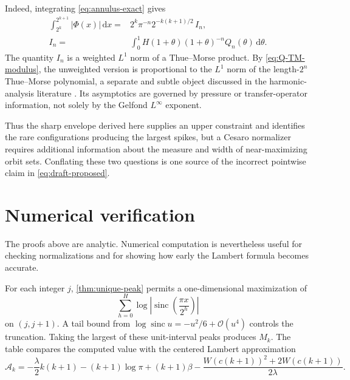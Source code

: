 \documentclass[11pt,oneside]{article}
\theoremstyle{definition}
\theoremstyle{remark}
\newcommand{\sinc}{\operatorname{sinc}}
\newcommand{\dd}{\,\mathrm d}
\newcommand{\bigO}{\mathcal O}
\newcommand{\PhiF}{\Phi}
\begin{document}
Indeed, integrating \eqref{eq:annulus-exact} gives
\begin{equation}
\begin{split}
 \int_{2^k}^{2^{k+1}}|\PhiF(x)|\dd x
 ={}&2^k\pi^{-n}2^{-k(k+1)/2}\,I_n,\\
 I_n={}&\int_0^1
 H(1+\theta)(1+\theta)^{-n}Q_n(\theta)\dd\theta.
\end{split}
\label{eq:annulus-L1-reduction}
\end{equation}
The quantity \(I_n\) is a weighted \(L^1\) norm of a Thue--Morse product.
By \eqref{eq:Q-TM-modulus}, the unweighted version is proportional to the
\(L^1\) norm of the length-\(2^n\) Thue--Morse polynomial, a separate and
subtle object discussed in the harmonic-analysis literature
\cite{queffelec2018}.  Its asymptotics are governed by pressure or
transfer-operator information, not solely by the Gelfond \(L^\infty\)
exponent.

Thus the sharp envelope derived here supplies an upper constraint and
identifies the rare configurations producing the largest spikes, but a
Cesaro normalizer requires additional information about the measure and
width of near-maximizing orbit sets.  Conflating these two questions is one
source of the incorrect pointwise claim in \eqref{eq:draft-proposed}.

\section{Numerical verification}
\label{sec:numerics}

The proofs above are analytic.  Numerical computation is nevertheless useful
for checking normalizations and for showing how early the Lambert formula
becomes accurate.

For each integer \(j\), \cref{thm:unique-peak} permits a one-dimensional
maximization of
\[
 \sum_{h=0}^{H}\log\left|
 \sinc\!\left(\frac{\pi x}{2^h}\right)\right|
\]
on \((j,j+1)\).  A tail bound from
\(
 \log\sinc u=-u^2/6+\bigO(u^4)
\)
controls the truncation.  Taking the largest of these unit-interval peaks
produces \(M_k\).  The table compares the computed value with the centered
Lambert approximation
\begin{equation}
 \mathcal A_k=
 -\frac\lambda2k(k+1)-(k+1)\log\pi+(k+1)\beta
 -\frac{W(c(k+1))^2+2W(c(k+1))}{2\lambda}.
 \label{eq:centered-numerical-approx}
\end{equation}
\end{document}

